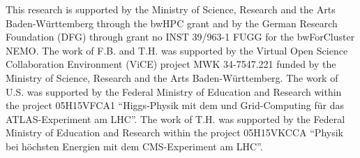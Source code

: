 
%
%


\begin{acknowledgements}
This research is supported by the Ministry of Science, Research and the Arts Baden-W\"urttemberg through the bwHPC grant
and by the German Research Foundation (DFG) through grant no INST
39/963-1 FUGG for the bwForCluster NEMO.
The work of F.B. and T.H. was supported by the Virtual Open Science
Collaboration Environment (ViCE) project MWK 34-7547.221 funded by the
Ministry of Science, Research and the Arts Baden-W\"urttemberg.
The work of U.S. was supported by  the Federal Ministry of Education
and Research within the project 05H15VFCA1
``Higgs-Physik mit dem und Grid-Computing f\"ur das ATLAS-Experiment
am LHC''.
The work of T.H. was supported by the Federal Ministry of Education
and Research within the project 05H15VKCCA ``Physik bei h\"ochsten Energien mit dem CMS-Experiment
    am LHC''.
\end{acknowledgements}


